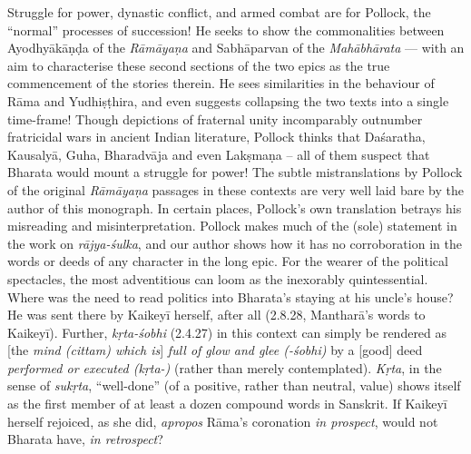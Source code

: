 Struggle for power, dynastic conflict, and armed combat are for Pollock, the ``normal'' processes of succession! He seeks to show the commonalities between Ayodhyākāṇḍa of the {\sl Rāmāyaṇa} and Sabhāparvan of the {\sl Mahābhārata} --- with an aim to characterise these second sections of the two epics as the true commencement of the stories therein. He sees similarities in the behaviour of Rāma and Yudhiṣṭhira, and even suggests collapsing the two texts into a single time-frame! Though depictions of fraternal unity incomparably outnumber fratricidal wars in ancient Indian literature, Pollock thinks that Daśaratha, Kausalyā, Guha, Bharadvāja and even Lakṣmaṇa -- all of them suspect that Bharata would mount a struggle for power! The subtle mistranslations by Pollock of the original {\sl Rāmāyaṇa} passages in these contexts are very well laid bare by the author of this monograph. In certain places, Pollock's own translation betrays his misreading and misinterpretation. Pollock makes much of the (sole) statement in the work on {\sl rājya-śulka}, and our author shows how it has no corroboration in the words or deeds of any character in the long epic. For the wearer of the political spectacles, the most adventitious can loom as the inexorably quintessential. Where was the need to read politics into Bharata's staying at his uncle's house? He was sent there by Kaikeyī herself, after all (2.8.28, Mantharā's words to Kaikeyī). Further, {\sl kṛta-śobhi} (2.4.27) in this context can simply be rendered as [the {\sl mind (cittam) which is}] {\sl full of glow and glee (-śobhi)} by a [good] deed {\sl performed or executed (kṛta-)} (rather than merely contemplated). {\sl Kṛta}, in the sense of {\sl sukṛta}, ``well-done'' (of a positive, rather than neutral, value) shows itself as the first member of at least a dozen compound words in Sanskrit. If Kaikeyī herself rejoiced, as she did, {\sl apropos} Rāma's coronation {\sl in prospect}, would not Bharata have, {\sl in retrospect}?

